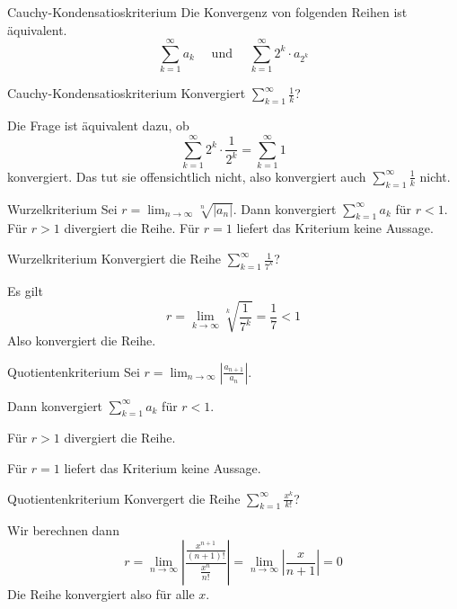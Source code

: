 \documentclass[german]{../spicker}
\begin{document}
\begin{algo}{Cauchy-Kondensatioskriterium}
    Die Konvergenz von folgenden Reihen ist äquivalent.
    $$
        \sum_{k=1}^{\infty} a_k \quad \text{ und } \quad
        \sum_{k=1}^{\infty} 2^k \cdot a_{2^k}
    $$
\end{algo}

\begin{example}{Cauchy-Kondensatioskriterium}
    Konvergiert $\sum_{k=1}^{\infty} \frac{1}{k}$?

    Die Frage ist äquivalent dazu, ob
    \[
        \sum_{k=1}^{\infty} 2^k \cdot \frac{1}{2^k} = \sum_{k=1}^{\infty} 1
    \]
    konvergiert. Das tut sie offensichtlich nicht, also konvergiert auch $\sum_{k=1}^{\infty} \frac{1}{k}$ nicht.
\end{example}

\begin{algo}{Wurzelkriterium}
    Sei $r = \lim_{n\to\infty} \sqrt[n]{|a_n|}$.
    Dann konvergiert $\sum_{k=1}^{\infty} a_k$ für $r<1$.
    Für $r>1$ divergiert die Reihe.
    Für $r=1$ liefert das Kriterium keine Aussage.
\end{algo}

\begin{example}{Wurzelkriterium}
    Konvergiert die Reihe $\sum_{k=1}^{\infty} \frac{1}{7^k}$?

    Es gilt
    \[
        r = \lim_{k\to\infty} \sqrt[k]{\frac{1}{7^k}} = \frac{1}{7} < 1
    \]
    Also konvergiert die Reihe.
\end{example}

\begin{algo}{Quotientenkriterium}
    Sei $r = \lim_{n\to\infty} \left| \frac{a_{n+1}}{a_n} \right|$.

    Dann konvergiert $\sum_{k=1}^{\infty} a_k$ für $r<1$.

    Für $r>1$ divergiert die Reihe.

    Für $r=1$ liefert das Kriterium keine Aussage.
\end{algo}

\begin{example}{Quotientenkriterium}
    Konvergert die Reihe $\sum_{k=1}^{\infty} \frac{x^k}{k!}$?

    Wir berechnen dann
    \[
        r = \lim_{n\to\infty} \left| \frac{\frac{x^{n+1}}{(n+1)!}}{\frac{x^n}{n!}} \right|
        = \lim_{n\to\infty} \left| \frac{x}{n+1} \right| = 0
    \]
    Die Reihe konvergiert also für alle $x$.
\end{example}
\end{document}
